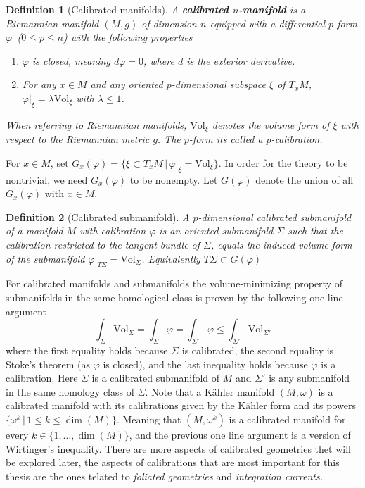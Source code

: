 \documentclass[12pt,twoside,a4paper]{report}
\newtheorem{definition}{Definition}[section]
\newcommand{\sig}{\ensuremath{\Sigma}}
\begin{document}
\begin{definition}[Calibrated manifolds] A \textbf{calibrated $n$-manifold} is a Riemannian manifold $(M, g)$ of dimension $n$ equipped with a differential $p$-form $\varphi\,$  ($0 \leq {p} \leq{n}$) with the following properties
\begin{enumerate}
 \item $\varphi$ is closed, meaning $d\varphi = 0$, where $d$ is the exterior derivative.
 \item For any $x \in M$ and any oriented $p$-dimensional subspace $\xi$ of $T_{x}M$, $\varphi|_{\xi} = \lambda \textrm{Vol}_{\xi}$ with $\lambda\leq 1$.
\end{enumerate}
When referring to Riemannian manifolds, $\textrm{Vol}_{\xi}$ denotes the volume form of  $\xi$ with respect to the Riemannian metric $g$. The $p$-form its called a $p$-\emph{calibration}.
\end{definition}
For $x\in M$, set $G_{x}(\varphi) = \{ \xi \subset T_{x}M\,\vert\,  \varphi|_{\xi} = \textrm{Vol}_{\xi} \}$. In order for the theory to be nontrivial, we need $G_x(\varphi)$ to be nonempty. Let $G(\varphi)$ denote the union of all $G_x(\varphi)$ with $x\in M$.
\begin{definition}[Calibrated submanifold]
A $p$-dimensional calibrated submanifold of a manifold $M$ with calibration $\varphi$ is an oriented submanifold $\sig$ such that the calibration restricted to the tangent bundle of $\Sigma$, equals the induced volume form of the submanifold $\varphi|_{T\Sigma}=\textrm{Vol}_{\Sigma}$. Equivalently $T\Sigma\subset G(\varphi)$
\end{definition}
For calibrated manifolds and submanifolds the volume-minimizing property of submanifolds in the same homological class is proven by the following one line argument
\begin{equation}\label{oneline}
  \int_{\sig}\mathrm{Vol}_{\Sigma}=\int_{\Sigma}\varphi =\int_{\Sigma'}\varphi \leq \int_{\Sigma'}\mathrm{Vol}_{\Sigma'}
\end{equation}
where the first equality holds because $\sig$ is calibrated, the second equality is Stoke's theorem (as $\varphi$ is closed), and the last inequality holds because $ \varphi$ is a calibration.
Here $\sig$ is a calibrated submanifold of $M$ and $\Sigma'$ is any submanifold in the same homology class of $\Sigma$. Note that a Kähler manifold $(M,\omega)$ is a calibrated manifold with its calibrations given by the Kähler form and its powers $\{\omega^{k}\,\vert\, 1\leq k\leq \dim(M)\}$. Meaning that $(M,\omega^{k})$ is a calibrated manifold for every $k\in\{1,\dots,\dim(M)\}$, and the previous one line argument is a version of Wirtinger's inequality. There are more aspects of calibrated geometries thet will be explored later, the aspects of calibrations that are most important for this thesis are the ones telated to \emph{foliated geometries} and \emph{integration currents.}
\end{document}
